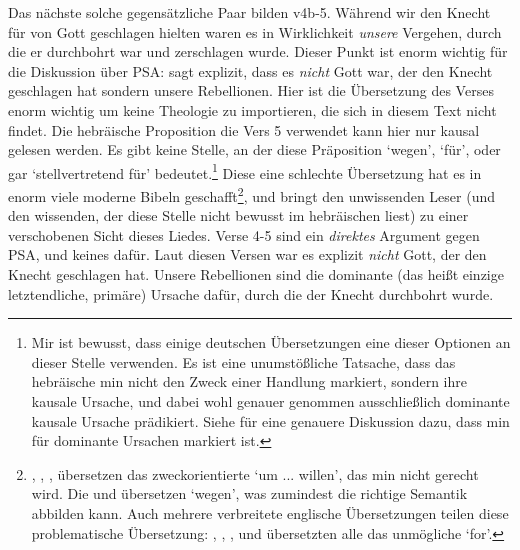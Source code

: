 Das nächste solche gegensätzliche Paar bilden v4b-5.
Während wir den Knecht für von Gott geschlagen hielten waren es in Wirklichkeit \textit{unsere} Vergehen, durch die er durchbohrt war und zerschlagen wurde.
Dieser Punkt ist enorm wichtig für die Diskussion über PSA:  sagt explizit, dass es \textit{nicht} Gott war, der den Knecht geschlagen hat sondern unsere Rebellionen.
Hier ist die Übersetzung des Verses enorm wichtig um keine Theologie zu importieren, die sich in diesem Text nicht findet.
Die hebräische Proposition die Vers 5 verwendet kann hier nur kausal gelesen werden.
Es gibt keine Stelle, an der diese Präposition `wegen', `für', oder gar `stellvertretend für' bedeutet.\footnote{
Mir ist bewusst, dass einige deutschen Übersetzungen eine dieser Optionen an dieser Stelle verwenden.
Es ist eine unumstößliche Tatsache, dass das hebräische min nicht den Zweck einer Handlung markiert, sondern ihre kausale Ursache, und dabei wohl genauer genommen ausschließlich dominante kausale Ursache prädikiert.
Siehe \Cite{semantic-properties-of-prepositions} für eine genauere Diskussion dazu, dass min für dominante Ursachen markiert ist.
}
Diese eine schlechte Übersetzung hat es in enorm viele moderne Bibeln geschafft\footnote{
	\Cite{lut}, \Cite{elb}, \Cite{slt}, \Cite{meng} übersetzen das zweckorientierte `um ... willen', das min nicht gerecht wird.
	Die \Cite{eü} und \Cite{neü} übersetzen `wegen', was zumindest die richtige Semantik abbilden kann.
	Auch mehrere verbreitete englische Übersetzungen teilen diese problematische Übersetzung: \Cite{niv}, \Cite{esv}, \Cite{nkjv}, und \Cite{nasb95} übersetzten alle das unmögliche `for'.
}, und bringt den unwissenden Leser (und den wissenden, der diese Stelle nicht bewusst im hebräischen liest) zu einer verschobenen Sicht dieses Liedes.
Verse 4-5 sind ein \textit{direktes} Argument gegen PSA, und keines dafür.
Laut diesen Versen war es explizit \textit{nicht} Gott, der den Knecht geschlagen hat.
Unsere Rebellionen sind die dominante (das heißt einzige letztendliche, primäre) Ursache dafür, durch die der Knecht durchbohrt wurde.

